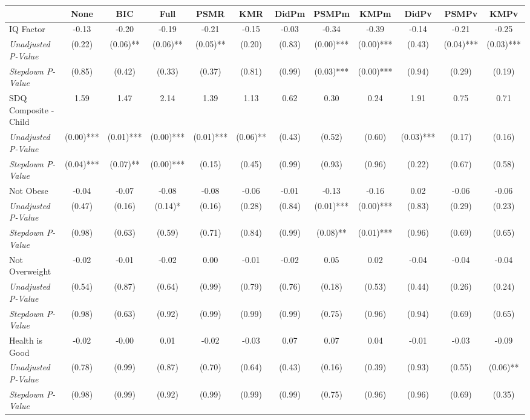 \begin{tabular}{l c c c c c c c c c c c}
\toprule
 & None & BIC & Full & PSMR & KMR & DidPm & PSMPm & KMPm & DidPv & PSMPv & KMPv \\
\midrule
IQ Factor & -0.13 & -0.20 & -0.19 & -0.21 & -0.15 & -0.03 & -0.34 & -0.39 & -0.14 & -0.21 & -0.25 \\
\quad \textit{Unadjusted P-Value} & (0.22) & (0.06)** & (0.06)** & (0.05)** & (0.20) & (0.83) & (0.00)*** & (0.00)*** & (0.43) & (0.04)*** & (0.03)*** \\
\quad \textit{Stepdown P-Value} & (0.85) & (0.42) & (0.33) & (0.37) & (0.81) & (0.99) & (0.03)*** & (0.00)*** & (0.94) & (0.29) & (0.19) \\
SDQ Composite - Child & 1.59 & 1.47 & 2.14 & 1.39 & 1.13 & 0.62 & 0.30 & 0.24 & 1.91 & 0.75 & 0.71 \\
\quad \textit{Unadjusted P-Value} & (0.00)*** & (0.01)*** & (0.00)*** & (0.01)*** & (0.06)** & (0.43) & (0.52) & (0.60) & (0.03)*** & (0.17) & (0.16) \\
\quad \textit{Stepdown P-Value} & (0.04)*** & (0.07)** & (0.00)*** & (0.15) & (0.45) & (0.99) & (0.93) & (0.96) & (0.22) & (0.67) & (0.58) \\
Not Obese & -0.04 & -0.07 & -0.08 & -0.08 & -0.06 & -0.01 & -0.13 & -0.16 & 0.02 & -0.06 & -0.06 \\
\quad \textit{Unadjusted P-Value} & (0.47) & (0.16) & (0.14)* & (0.16) & (0.28) & (0.84) & (0.01)*** & (0.00)*** & (0.83) & (0.29) & (0.23) \\
\quad \textit{Stepdown P-Value} & (0.98) & (0.63) & (0.59) & (0.71) & (0.84) & (0.99) & (0.08)** & (0.01)*** & (0.96) & (0.69) & (0.65) \\
Not Overweight & -0.02 & -0.01 & -0.02 & 0.00 & -0.01 & -0.02 & 0.05 & 0.02 & -0.04 & -0.04 & -0.04 \\
\quad \textit{Unadjusted P-Value} & (0.54) & (0.87) & (0.64) & (0.99) & (0.79) & (0.76) & (0.18) & (0.53) & (0.44) & (0.26) & (0.24) \\
\quad \textit{Stepdown P-Value} & (0.98) & (0.63) & (0.92) & (0.99) & (0.99) & (0.99) & (0.75) & (0.96) & (0.94) & (0.69) & (0.65) \\
Health is Good & -0.02 & -0.00 & 0.01 & -0.02 & -0.03 & 0.07 & 0.07 & 0.04 & -0.01 & -0.03 & -0.09 \\
\quad \textit{Unadjusted P-Value} & (0.78) & (0.99) & (0.87) & (0.70) & (0.64) & (0.43) & (0.16) & (0.39) & (0.93) & (0.55) & (0.06)** \\
\quad \textit{Stepdown P-Value} & (0.98) & (0.99) & (0.92) & (0.99) & (0.99) & (0.99) & (0.75) & (0.96) & (0.96) & (0.69) & (0.35) \\

\end{tabular}
